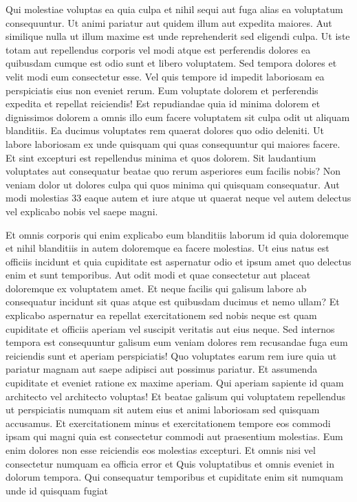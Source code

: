 \documentclass[a4paper,12pt]{report}
\begin{document}
\par Qui molestiae voluptas ea quia culpa et nihil sequi aut fuga alias ea voluptatum consequuntur. Ut animi pariatur aut quidem illum aut expedita maiores. Aut similique nulla ut illum maxime est unde reprehenderit sed eligendi culpa. Ut iste totam aut repellendus corporis vel modi atque est perferendis dolores ea quibusdam cumque est odio sunt et libero voluptatem. Sed tempora dolores et velit modi eum consectetur esse. Vel quis tempore id impedit laboriosam ea perspiciatis eius non eveniet rerum. Eum voluptate dolorem et perferendis expedita et repellat reiciendis! Est repudiandae quia id minima dolorem et dignissimos dolorem a omnis illo eum facere voluptatem sit culpa odit ut aliquam blanditiis. Ea ducimus voluptates rem quaerat dolores quo odio deleniti. Ut labore laboriosam ex unde quisquam qui quas consequuntur qui maiores facere. Et sint excepturi est repellendus minima et quos dolorem. Sit laudantium voluptates aut consequatur beatae quo rerum asperiores eum facilis nobis? Non veniam dolor ut dolores culpa qui quos minima qui quisquam consequatur. Aut modi molestias 33 eaque autem et iure atque ut quaerat neque vel autem delectus vel explicabo nobis vel saepe magni. 

\par Et omnis corporis qui enim explicabo eum blanditiis laborum id quia doloremque et nihil blanditiis in autem doloremque ea facere molestias. Ut eius natus est officiis incidunt et quia cupiditate est aspernatur odio et ipsum amet quo delectus enim et sunt temporibus. Aut odit modi et quae consectetur aut placeat doloremque ex voluptatem amet. Et neque facilis qui galisum labore ab consequatur incidunt sit quas atque est quibusdam ducimus et nemo ullam? Et explicabo aspernatur ea repellat exercitationem sed nobis neque est quam cupiditate et officiis aperiam vel suscipit veritatis aut eius neque. Sed internos tempora est consequuntur galisum eum veniam dolores rem recusandae fuga eum reiciendis sunt et aperiam perspiciatis! Quo voluptates earum rem iure quia ut pariatur magnam aut saepe adipisci aut possimus pariatur. Et assumenda cupiditate et eveniet ratione ex maxime aperiam. Qui aperiam sapiente id quam architecto vel architecto voluptas! Et beatae galisum qui voluptatem repellendus ut perspiciatis numquam sit autem eius et animi laboriosam sed quisquam accusamus. Et exercitationem minus et exercitationem tempore eos commodi ipsam qui magni quia est consectetur commodi aut praesentium molestias. Eum enim dolores non esse reiciendis eos molestias excepturi. Et omnis nisi vel consectetur numquam ea officia error et Quis voluptatibus et omnis eveniet in dolorum tempora. Qui consequatur temporibus et cupiditate enim sit numquam unde id quisquam fugiat
\end{document}
